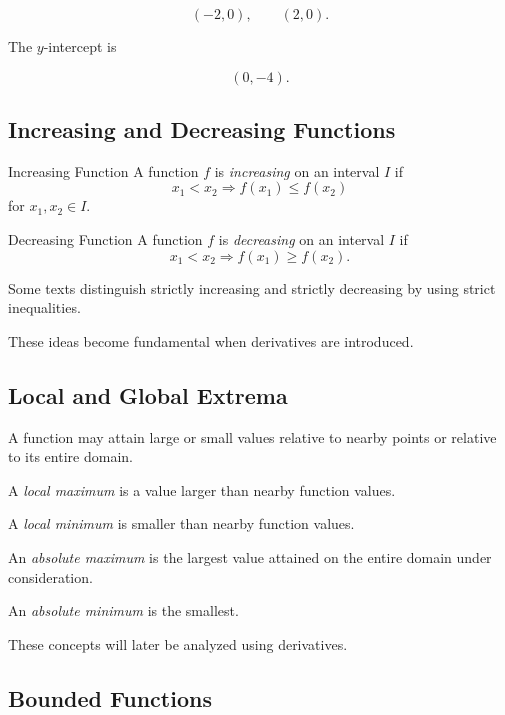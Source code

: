 \[ (-2,0),\qquad(2,0). \]

The \(y\)-intercept is

\[ (0,-4). \]

\subsection{Increasing and Decreasing Functions}
\label{subsec:increasing-decreasing}

\begin{definitionbox}{Increasing Function}
A function \(f\) is \emph{increasing} on an interval \(I\) if
\[ x_1<x_2\Longrightarrow f(x_1)\leq f(x_2) \]
for \(x_1,x_2\in I\).
\end{definitionbox}

\begin{definitionbox}{Decreasing Function}
A function \(f\) is \emph{decreasing} on an interval \(I\) if
\[ x_1<x_2\Longrightarrow f(x_1)\geq f(x_2). \]
\end{definitionbox}

Some texts distinguish strictly increasing and strictly decreasing by using
strict inequalities.

These ideas become fundamental when derivatives are introduced.

\subsection{Local and Global Extrema}
\label{subsec:precalculus-extrema}

A function may attain large or small values relative to nearby points or
relative to its entire domain.

A \emph{local maximum} is a value larger than nearby function values.

A \emph{local minimum} is smaller than nearby function values.

An \emph{absolute maximum} is the largest value attained on the entire
domain under consideration.

An \emph{absolute minimum} is the smallest.

These concepts will later be analyzed using derivatives.

\subsection{Bounded Functions}
\label{subsec:bounded-functions}

